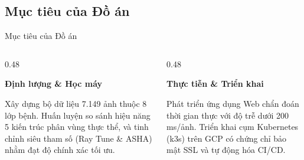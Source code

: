 \subsection{Mục tiêu của Đồ án}
\begin{frame}{Mục tiêu của Đồ án}
    \begin{columns}[t]
        \begin{column}{0.48\textwidth}
            \justifying
            \centerline{\textbf{Định lượng \& Học máy}}
            \vspace{0.3cm}
            
            Xây dựng bộ dữ liệu 7.149 ảnh thuộc 8 lớp bệnh. Huấn luyện so sánh hiệu năng 5 kiến trúc phân vùng thực thể, và tinh chỉnh siêu tham số (Ray Tune \& ASHA) nhằm đạt độ chính xác tối ưu.
        \end{column}
        \begin{column}{0.48\textwidth}
            \justifying
            \centerline{\textbf{Thực tiễn \& Triển khai}}
            \vspace{0.3cm}
            
            Phát triển ứng dụng Web chẩn đoán thời gian thực với độ trễ dưới 200 ms/ảnh. Triển khai cụm Kubernetes (k3s) trên GCP có chứng chỉ bảo mật SSL và tự động hóa CI/CD.
        \end{column}
    \end{columns}
\end{frame}

